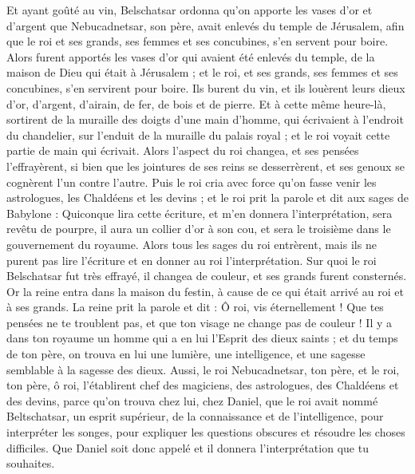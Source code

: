 \begin{multicols}{2}
Et ayant goûté au vin, Belschatsar ordonna qu'on apporte les vases d'or et d'argent que Nebucadnetsar, son père, avait enlevés du temple de Jérusalem, afin que le roi et ses grands, ses femmes et ses concubines, s'en servent pour boire.
Alors furent apportés les vases d'or qui avaient été enlevés du temple, de la maison de Dieu qui était à Jérusalem ; et le roi, et ses grands, ses femmes et ses concubines, s'en servirent pour boire.
Ils burent du vin, et ils louèrent leurs dieux d'or, d'argent, d'airain, de fer, de bois et de pierre.
Et à cette même heure-là, sortirent de la muraille des doigts d'une main d'homme, qui écrivaient à l'endroit du chandelier, sur l'enduit de la muraille du palais royal ; et le roi voyait cette partie de main qui écrivait.
Alors l'aspect du roi changea, et ses pensées l'effrayèrent, si bien que les jointures de ses reins se desserrèrent, et ses genoux se cognèrent l'un contre l'autre.
Puis le roi cria avec force qu'on fasse venir les astrologues, les Chaldéens et les devins ; et le roi prit la parole et dit aux sages de Babylone : Quiconque lira cette écriture, et m'en donnera l'interprétation, sera revêtu de pourpre, il aura un collier d'or à son cou, et sera le troisième dans le gouvernement du royaume.
Alors tous les sages du roi entrèrent, mais ils ne purent pas lire l'écriture et en donner au roi l'interprétation.
Sur quoi le roi Belschatsar fut très effrayé, il changea de couleur, et ses grands furent consternés.
Or la reine entra dans la maison du festin, à cause de ce qui était arrivé au roi et à ses grands. La reine prit la parole et dit : Ô roi, vis éternellement ! Que tes pensées ne te troublent pas, et que ton visage ne change pas de couleur !
Il y a dans ton royaume un homme qui a en lui l'Esprit des dieux saints ; et du temps de ton père, on trouva en lui une lumière, une intelligence, et une sagesse semblable à la sagesse des dieux. Aussi, le roi Nebucadnetsar, ton père, et le roi, ton père, ô roi, l'établirent chef des magiciens, des astrologues, des Chaldéens et des devins,
parce qu'on trouva chez lui, chez Daniel, que le roi avait nommé Beltschatsar, un esprit supérieur, de la connaissance et de l'intelligence, pour interpréter les songes, pour expliquer les questions obscures et résoudre les choses difficiles. Que Daniel soit donc appelé et il donnera l'interprétation que tu souhaites.

\end{multicols}
